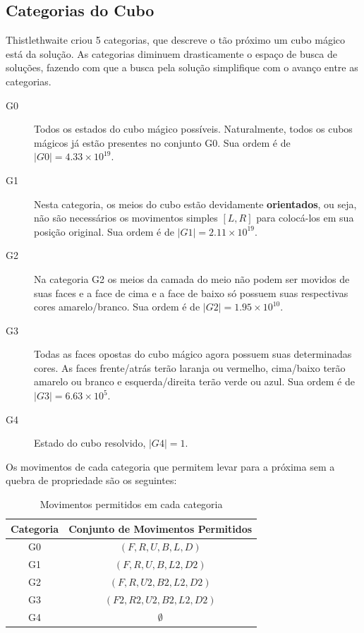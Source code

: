 \documentclass[12pt]{article}
\begin{document}
  \subsection{Categorias do Cubo}
    Thistlethwaite criou 5 categorias, que descreve o tão próximo um cubo mágico está da solução. As categorias diminuem drasticamente o espaço de busca de soluções, fazendo com que a busca pela solução simplifique com o avanço entre as categorias.

    \begin{description}
      \item [G0] Todos os estados do cubo mágico possíveis. Naturalmente, todos os cubos mágicos já estão presentes no conjunto G0. Sua ordem é de $|G0| = 4.33 \times 10^{19}$.
      \item [G1] Nesta categoria, os meios do cubo estão devidamente \textbf{orientados}, ou seja, não são necessários os movimentos simples $[L, R]$ para colocá-los em sua posição original. Sua ordem é de $|G1| = 2.11 \times 10^{19}$.
      \item [G2] Na categoria G2 os meios da camada do meio não podem ser movidos de suas faces e a face de cima e a face de baixo só possuem suas respectivas cores amarelo/branco. Sua ordem é de $|G2| = 1.95 \times 10^{10}$.
      \item [G3] Todas as faces opostas do cubo mágico agora possuem suas determinadas cores. As faces frente/atrás terão laranja ou vermelho, cima/baixo terão amarelo ou branco e esquerda/direita terão verde ou azul. Sua ordem é de $|G3| = 6.63 \times 10^{5}$.
      \item [G4] Estado do cubo resolvido, $|G4| = 1$.
    \end{description}






  Os movimentos de cada categoria que permitem levar para a próxima sem a quebra de propriedade são os seguintes:

  \begin{table}[ht]
      \centering
      \caption{Movimentos permitidos em cada categoria}
      \begin{tabular}{|c|c|}
        \hline
        \textbf{Categoria} & \textbf{Conjunto de Movimentos Permitidos}  \\ \hline
            G0             &  $(F, R, U, B, L, D)$           \\ \hline
            G1             &  $(F, R, U, B, L2, D2)$         \\ \hline
            G2             &  $(F, R, U2, B2, L2, D2)$       \\ \hline
            G3             &  $(F2, R2, U2, B2, L2, D2)$     \\ \hline
            G4             &  $\emptyset$                    \\ \hline
      \end{tabular}
  \end{table}
\end{document}
